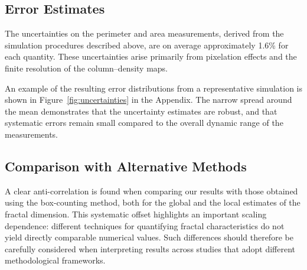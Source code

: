 \subsection{Error Estimates}

The uncertainties on the perimeter and area measurements, derived from the simulation procedures described above, are on average approximately 1.6\% for each quantity.  
These uncertainties arise primarily from pixelation effects and the finite resolution of the column–density maps.

An example of the resulting error distributions from a representative simulation is shown in Figure~\ref{fig:uncertainties} in the Appendix.  
The narrow spread around the mean demonstrates that the uncertainty estimates are robust, and that systematic errors remain small compared to the overall dynamic range of the measurements.

\subsection{Comparison with Alternative Methods}

A clear anti-correlation is found when comparing our results with those obtained using the box-counting method, both for the global and the local estimates of the fractal dimension.  
This systematic offset highlights an important scaling dependence: different techniques for quantifying fractal characteristics do not yield directly comparable numerical values.  
Such differences should therefore be carefully considered when interpreting results across studies that adopt different methodological frameworks.
